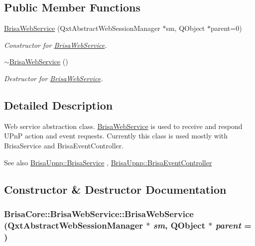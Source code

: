 \subsection*{Public Member Functions}
\begin{DoxyCompactItemize}
\item 
\hyperlink{classBrisaCore_1_1BrisaWebService_a0d19c4a676c24ebc3fd13e781ad2ae37}{BrisaWebService} (QxtAbstractWebSessionManager $\ast$sm, QObject $\ast$parent=0)
\begin{DoxyCompactList}\small\item\em Constructor for \hyperlink{classBrisaCore_1_1BrisaWebService}{BrisaWebService}. \item\end{DoxyCompactList}\item 
\hyperlink{classBrisaCore_1_1BrisaWebService_a15cfdd76811cd0324163398d1220c693}{$\sim$BrisaWebService} ()
\begin{DoxyCompactList}\small\item\em Destructor for \hyperlink{classBrisaCore_1_1BrisaWebService}{BrisaWebService}. \item\end{DoxyCompactList}\end{DoxyCompactItemize}


\subsection{Detailed Description}
Web service abstraction class. \hyperlink{classBrisaCore_1_1BrisaWebService}{BrisaWebService} is used to receive and respond UPnP action and event requests. Currently this class is used mostly with BrisaService and BrisaEventController.

\begin{DoxySeeAlso}{See also}
\hyperlink{classBrisaUpnp_1_1BrisaService}{BrisaUpnp::BrisaService} , \hyperlink{classBrisaUpnp_1_1BrisaEventController}{BrisaUpnp::BrisaEventController} 
\end{DoxySeeAlso}


\subsection{Constructor \& Destructor Documentation}
\hypertarget{classBrisaCore_1_1BrisaWebService_a0d19c4a676c24ebc3fd13e781ad2ae37}{
\subsubsection[{BrisaWebService}]{\setlength{\rightskip}{0pt plus 5cm}BrisaCore::BrisaWebService::BrisaWebService (QxtAbstractWebSessionManager $\ast$ {\em sm}, \/  QObject $\ast$ {\em parent} = {})}}
\label{classBrisaCore_1_1BrisaWebService_a0d19c4a676c24ebc3fd13e781ad2ae37}


